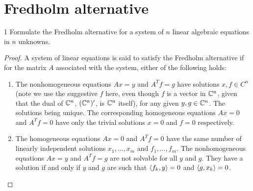 \section{Fredholm alternative}


\begin{exercise}{1}
Formulate the Fredholm alternative for a system of $n$ linear algebraic equations in $n$ unknowns.
\end{exercise}
\begin{proof}
A system of linear equations is said to satisfy the Fredholm alternative if for the matrix $A$ associated with the system, either of the following holds:
\begin{enumerate}
    \item The nonhomogeneous equations $Ax = y$ and $A^T f = g$ have solutions $x, f \in C^n$ (note we use the suggestive $f$ here, even though $f$ is a vector in $\mathbb{C}^n$, given that the dual of $\mathbb{C}^n$, $(\mathbb{C}^n)'$, is $\mathbb{C}^n$ itself), for any given $y, g \in \mathbb{C}^n$.
    The solutions being unique.
    The corresponding homogeneous equations $Ax = 0$ and $A^T f = 0$ have only the trivial solutions $x = 0$ and $f = 0$ respectively.
    \item The homogeneous equations $Ax = 0$ and $A^T f = 0$ have the same number of linearly independent solutions $x_1, \dots, x_m$ and $f_1, \dots, f_m$.
    The nonhomogeneous equations $Ax = y$ and $A^T f = g$ are not solvable for all $y$ and $g$.
    They have a solution if and only if $y$ and $g$ are such that $\langle f_k, y\rangle = 0$ and $\langle g, x_k\rangle = 0$.
\end{enumerate}
\end{proof}
